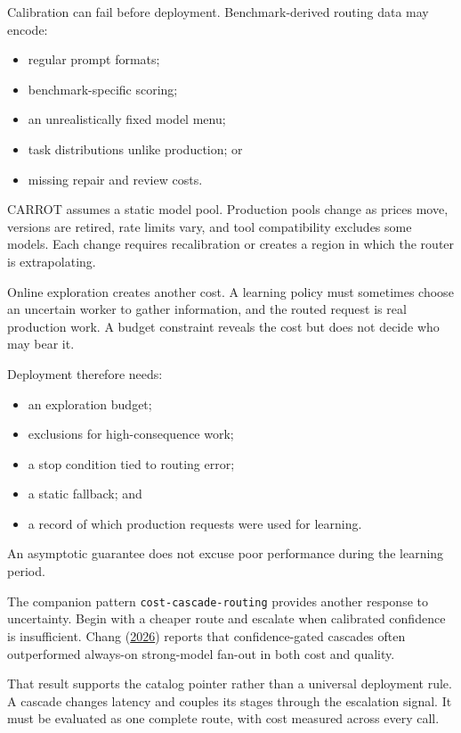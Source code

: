 
Calibration can fail before deployment. Benchmark-derived routing data may encode:

\begin{itemize}
\tightlist
\item
  regular prompt formats;
\item
  benchmark-specific scoring;
\item
  an unrealistically fixed model menu;
\item
  task distributions unlike production; or
\item
  missing repair and review costs.
\end{itemize}

CARROT assumes a static model pool. Production pools change as prices move, versions are retired, rate limits vary, and tool compatibility excludes some models. Each change requires recalibration or creates a region in which the router is extrapolating.

Online exploration creates another cost. A learning policy must sometimes choose an uncertain worker to gather information, and the routed request is real production work. A budget constraint reveals the cost but does not decide who may bear it.


Deployment therefore needs:

\begin{itemize}
\tightlist
\item
  an exploration budget;
\item
  exclusions for high-consequence work;
\item
  a stop condition tied to routing error;
\item
  a static fallback; and
\item
  a record of which production requests were used for learning.
\end{itemize}

An asymptotic guarantee does not excuse poor performance during the learning period.

The companion pattern \texttt{cost-cascade-routing} provides another response to uncertainty. Begin with a cheaper route and escalate when calibrated confidence is insufficient. Chang (\href{https://arxiv.org/abs/2604.12262}{2026}) reports that confidence-gated cascades often outperformed always-on strong-model fan-out in both cost and quality.

That result supports the catalog pointer rather than a universal deployment rule. A cascade changes latency and couples its stages through the escalation signal. It must be evaluated as one complete route, with cost measured across every call.


